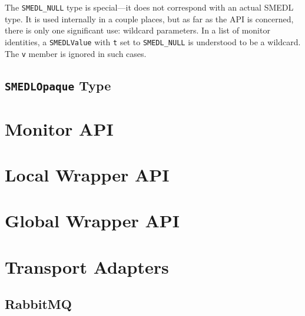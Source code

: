\documentclass[paper=letter,titlepage,captions=tableheading]{scrartcl}
\begin{document}
The \texttt{SMEDL\_NULL} type is special---it does not correspond with an
actual SMEDL type. It is used internally in a couple places, but as far as the
API is concerned, there is only one significant use: wildcard parameters. In a
list of monitor identities, a \texttt{SMEDLValue} with \texttt{t} set to
\texttt{SMEDL\_NULL} is understood to be a wildcard. The \texttt{v} member is
ignored in such cases.

\subsection{\texttt{SMEDLOpaque} Type}
\label{subsec:smedlopaque}



\section{Monitor API}
\label{sec:mon}


\section{Local Wrapper API}
\label{sec:local}


\section{Global Wrapper API}
\label{sec:global}


\section{Transport Adapters}
\label{sec:transport}


\subsection{RabbitMQ}
\label{subsec:rabbitmq}


\end{document}
